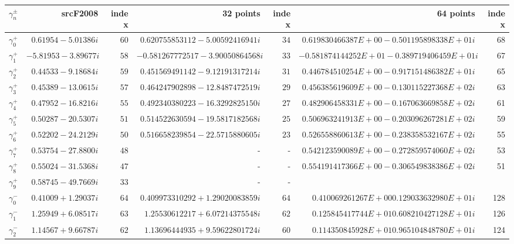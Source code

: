 \documentclass[a4paper]{article}
\begin{document}
\begin{table}
 \centering
 \begin{adjustbox}{width=1\textwidth}
     \small
 \begin{tabular}{c | r | r | r | r | r | r }
 \hline
 $\gamma^{\pm}_n$ & srcF2008 & index  & 32 points & index & 64 points& index\\
 \hline
 $\gamma_0^{+}$ &  $ 0.61954  - 5.01386 i$ &$ 60$  &$ 0.620755853112 - 5.00592416941i$ & $34 $ & $0.619830466387E+00 -0.501195898338E+01i$ &68 \\
 $\gamma_1^{+}$ &  $-5.81953  - 3.89677 i$ &$ 58$  &$-0.581267772517 - 3.90050864568i$& $33 $ & $-0.581874144252E+01 -0.389719406459E+01 i$ &67\\
 $\gamma_2^{+}$ &  $ 0.44533  - 9.18684 i$ &$ 59$  &$ 0.451569491142 -  9.12191317214i$ &$ 31$&$0.446784510254E+00 -0.917151486382E+01 i$& 65 \\
 $\gamma_3^{+}$ &  $ 0.45389  - 13.0615 i$ &$ 57$  &$ 0.464247902898 - 12.8487472519i $& $29 $&$  0.456385619609E+00 -0.130115227368E+02i$& 63   \\ 
 $\gamma_4^{+}$ &  $ 0.47952  - 16.8216 i$ &$ 55$  &$ 0.492340380223 - 16.3292825150i $& $27 $&$ 0.482906458331E+00 -0.167063669858E+02i$ &61\\
 $\gamma_5^{+}$ &  $ 0.50287  - 20.5307 i$ &$ 51$  &$ 0.514522630594 -19.5817182568i$& $25$ & $0.506963241913E+00 -0.203096267281E+02i$ &59 \\
 $\gamma_6^{+}$ &  $ 0.52202  - 24.2129 i$ &$ 50$  &$ 0.516658239854 -22.5715880605i$& $23$ & $0.526558860613E+00 -0.238358532167E+02i$ & 55 \\
 $\gamma_7^{+}$ &  $ 0.53754  - 27.8800 i$ &$ 48$  & - & -&$0.542123590089E+00 -0.272859574060E+02i$ & 53 \\                       
 $\gamma_8^{+}$ &  $ 0.55024  - 31.5368 i$ &$ 47$  & - & - & $0.554191417366E+00 -0.306549838386E+02i $ & 51 \\ 
 $\gamma_9^{+}$ &  $ 0.58745  - 49.7669 i$ &$ 33$  &- &- \\ \hline  
 $\gamma_0^{-}$ &  $ 0.41009  + 1.29037 i$ &$ 64$  &$0.409973310292  + 1.29020083859i$& $64 $ & $0.410069261267E+00  0.129033632980E+01i $ &128 \\
 $\gamma_1^{-}$ &  $ 1.25949  + 6.08517 i$ &$ 63$  &$1.25530612217  + 6.07214375548i $& $62 $&$0.125845417744E+01  0.608210427128E+01i$ & 126\\
 $\gamma_2^{-}$ &  $ 1.14567  + 9.66787 i$ &$ 62$  &$1.13696444935  + 9.59622801724i $& $ 60$ &$0.114350845928E+01  0.965104848780E+01i$& 124 \\

\end{tabular}
\end{adjustbox}
\end{table}
\end{document}
